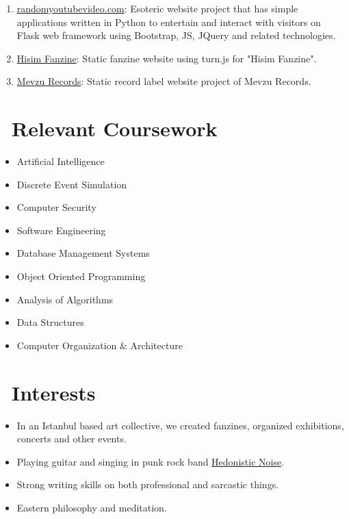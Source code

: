 \documentclass{resume}
\begin{document}
\begin{enumerate}[parsep=0.5ex]
    \item \href{#!}{randomyoutubevideo.com}: Esoteric website project that has simple applications written in Python to entertain and interact with visitors on Flask web framework using Bootstrap, JS, JQuery and related technologies.
    \item \href{https://github.com/0x01h/hisim-fanzine}{Hisim Fanzine}: Static fanzine website using turn.js for "Hisim Fanzine".
    \item \href{https://github.com/0x01h/mevzu-records}{Mevzu Records}: Static record label website project of Mevzu Records.
\end{enumerate}

\section{\faBook\ Relevant Coursework}
\begin{itemize}[parsep=0.5ex]
  \item Artificial Intelligence
  \item Discrete Event Simulation
  \item Computer  Security
  \item Software Engineering
  \item Database Management Systems
  \item Object Oriented Programming
  \item Analysis of Algorithms
  \item Data Structures
  \item Computer Organization \& Architecture
\end{itemize}

\section{\faHeart\ Interests}
\begin{itemize}[parsep=0.5ex]
  \item In an Istanbul based art collective, we created fanzines, organized exhibitions, concerts and other events. 
  \item Playing guitar and singing in punk rock band \href{https://open.spotify.com/artist/49GZXacm1ImIxt7vCioeX5}{Hedonistic Noise}.
  \item Strong writing skills on both professional and sarcastic things.
  \item Eastern philosophy and meditation.
\end{itemize}
\end{document}
